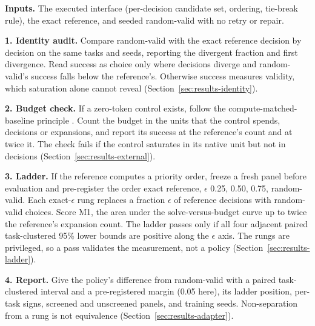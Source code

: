 \begin{protocolbox}[!t]
\caption{Validate before score. Four steps admit random-valid as a choice control and validate the success measure before any policy is scored.}
\label{box:procedure}
\begin{tcolorbox}[
  title={Four-step validation},
  colbacktitle=black!60,
  coltitle=white,
  colback=black!3,
  colframe=black!60,
  fonttitle=\bfseries,
  fontupper=\small,
  boxrule=0.5pt,
  boxsep=5pt]
\textbf{Inputs.} The executed interface (per-decision candidate set, ordering, tie-break rule), the exact reference, and seeded random-valid with no retry or repair.

\smallskip
\textbf{1. Identity audit.} Compare random-valid with the exact reference decision by decision on the same tasks and seeds, reporting the divergent fraction and first divergence. Read success as choice only where decisions diverge and random-valid's success falls below the reference's. Otherwise success measures validity, which saturation alone cannot reveal (Section~\ref{sec:results-identity}).

\smallskip
\textbf{2. Budget check.} If a zero-token control exists, follow the compute-matched-baseline principle \citep{li2019random}. Count the budget in the units that the control spends, decisions or expansions, and report its success at the reference's count and at twice it. The check fails if the control saturates in its native unit but not in decisions (Section~\ref{sec:results-external}).

\smallskip
\textbf{3. Ladder.} If the reference computes a priority order, freeze a fresh panel before evaluation and pre-register the order exact reference, $\epsilon$ 0.25, 0.50, 0.75, random-valid. Each exact-$\epsilon$ rung replaces a fraction $\epsilon$ of reference decisions with random-valid choices. Score M1, the area under the solve-versus-budget curve up to twice the reference's expansion count. The ladder passes only if all four adjacent paired task-clustered 95\% lower bounds are positive along the $\epsilon$ axis. The rungs are privileged, so a pass validates the measurement, not a policy (Section~\ref{sec:results-ladder}).

\smallskip
\textbf{4. Report.} Give the policy's difference from random-valid with a paired task-clustered interval and a pre-registered margin (0.05 here), its ladder position, per-task signs, screened and unscreened panels, and training seeds. Non-separation from a rung is not equivalence (Section~\ref{sec:results-adapter}).


\end{tcolorbox}
\end{protocolbox}
